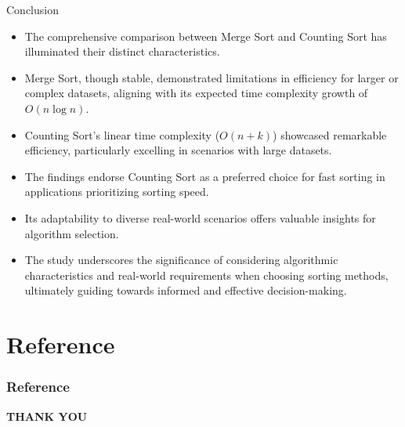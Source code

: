 \documentclass{beamer}
\begin{document}
	\begin{frame}{Conclusion}
		\begin{itemize}
			\item The comprehensive comparison between Merge Sort and Counting Sort has illuminated their distinct characteristics.
			\item Merge Sort, though stable, demonstrated limitations in efficiency for larger or complex datasets, aligning with its expected time complexity growth of \(O(n \log n)\).
			\item Counting Sort's linear time complexity (\(O(n + k)\)) showcased remarkable efficiency, particularly excelling in scenarios with large datasets.
		\end{itemize}
		
		
		\begin{itemize}
			\item The findings endorse Counting Sort as a preferred choice for fast sorting in applications prioritizing sorting speed.
			\item Its adaptability to diverse real-world scenarios offers valuable insights for algorithm selection.
			\item The study underscores the significance of considering algorithmic characteristics and real-world requirements when choosing sorting methods, ultimately guiding towards informed and effective decision-making.
		\end{itemize}
	\end{frame}
	
	\section{Reference}
	\begin{frame}
		\frametitle{Reference}
		
	
	\end{frame}
	\begin{frame}
		\begin{center}
			
			\textbf{THANK YOU}
		\end{center}    
	\end{frame}
\end{document}
